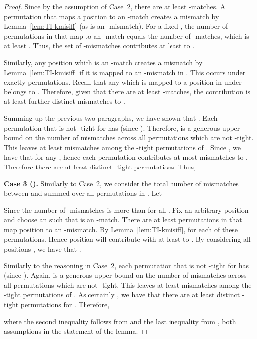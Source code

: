 \documentclass[11pt]{article}
\theoremstyle{plain}
\theoremstyle{definition}
\begin{document}
\begin{proof}
    Since  by the assumption of Case~2, there are at least  -matches. A permutation  that maps a position  to an -match creates a mismatch  by Lemma~\ref{lem:TI-kmisiff} (as  is an -mismatch). For a fixed , the number of permutations in  that map  to an -match equals the number of -matches, which is at least . Thus, the set  of  -mismatches contributes at least  to .

    Similarly, any position  which is an -match creates a mismatch  by Lemma~\ref{lem:TI-kmisiff} if it is mapped to an -mismatch in . This occurs under exactly  permutations. Recall that any  which is mapped to a position in  under  belongs to . Therefore, given that there are at least  -matches, the contribution is at least  further distinct mismatches to  .

    Summing up the previous two paragraphs, we have shown that .
    Each permutation  that is not -tight for  has  (since ). Therefore,  is a generous upper bound on the number of mismatches across all permutations which are not -tight. This leaves at least  mismatches among the -tight permutations of . Since , we have that  for any , hence each permutation contributes at most  mismatches to . Therefore there are at least  distinct -tight permutations. Thus, .
    \medskip

    \noindent
    \textbf{Case 3 ().}
    Similarly to Case~2, we consider the total number of mismatches between  and  summed over all permutations in . Let

Since  the number of -mismatches is more than  for all . Fix an arbitrary position  and choose an  such that  is an -match. There are at least  permutations  in  that map position  to an -mismatch. By Lemma~\ref{lem:TI-kmisiff},  for each of these permutations. Hence position  will contribute with at least  to . By considering all  positions , we have that .

    Similarly to the reasoning in Case~2, each permutation  that is not -tight for  has  (since ). Again,  is a generous upper bound on the number of mismatches across all permutations which are not -tight. This leaves at least  mismatches among the -tight permutations of . As certainly , we have that there are at least  distinct -tight permutations for . Therefore,

    where the second inequality follows from  and the last inequality from , both assumptions in the statement of the lemma.
\end{proof}
\end{document}
